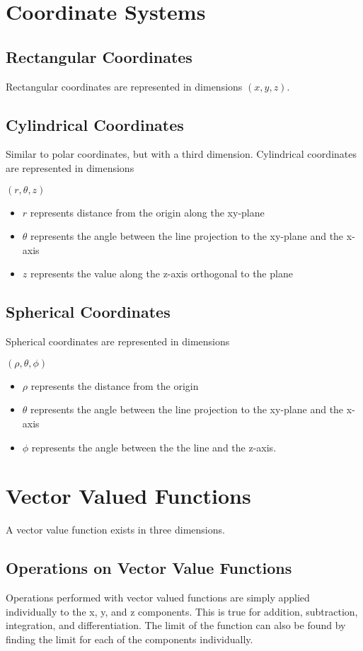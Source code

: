 \documentclass [12 pt, oneside] {book}
\begin{document}
\section{Coordinate Systems}
\subsection{Rectangular Coordinates}
Rectangular coordinates are represented in dimensions $(x,y,z)$.
\subsection{Cylindrical Coordinates}
Similar to polar coordinates, but with a third dimension. Cylindrical coordinates are represented in dimensions 
\begin{center}$(r,\theta,z)$\end{center}
\begin{itemize}
\item$r$ represents distance from the origin along the xy-plane
 \item$\theta$ represents the angle between the line projection to the xy-plane and the x-axis
 \item $z$ represents the value along the z-axis orthogonal to the plane
\end{itemize}
\subsection{Spherical Coordinates}
Spherical coordinates are represented in dimensions 
\begin{center}$(\rho,\theta,\phi)$\end{center}
\begin{itemize}
\item $\rho$ represents the distance from the origin
\item $\theta$ represents the angle between the line projection to the xy-plane and the x-axis
\item $\phi$ represents the angle between the the line and the z-axis.
\end{itemize}
\section{Vector Valued Functions}
A vector value function exists in three dimensions.
\subsection{Operations on Vector Value Functions}
Operations performed with vector valued functions are simply applied individually to the x, y, and z components. This is true for addition, subtraction, integration, and differentiation. The limit of the function can also be found by finding the limit for each of the components individually.
\end{document}

